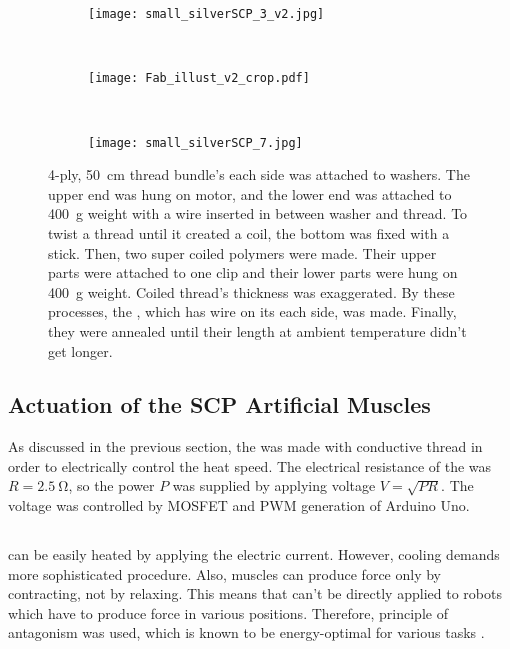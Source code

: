 \begin{figure}
	\centering
	\begin{subfigure}{.15\linewidth}
		\centering\texttt{[image: small\_silverSCP\_3\_v2.jpg]}
		\caption{\label{silverSCP_2}}
	\end{subfigure}
	~
	\begin{subfigure}{.45\linewidth}
		\centering\texttt{[image: Fab\_illust\_v2\_crop.pdf]}
		\caption{\label{silverSCP_illust}}
	\end{subfigure}
	~
	\begin{subfigure}{.15\linewidth}
		\centering\texttt{[image: small\_silverSCP\_7.jpg]}
		\caption{\label{silverSCP_annealing}}
	\end{subfigure}
	\caption[Process of making \scps with silver-painted nylon thread]{ 4-ply, \SI{50}{\centi\meter} thread bundle's each side was attached to washers. The upper end was hung on motor, and the lower end was attached to \SI{400}{\gram} weight with a wire inserted in between washer and thread.  To twist a thread until it created a coil, the bottom was fixed with a stick. Then, two super coiled polymers were made. Their upper parts were attached to one clip and their lower parts were hung on \SI{400}{\gram} weight. Coiled thread's thickness was exaggerated.  By these processes, the \scpnospace, which has wire on its each side, was made. Finally, they were annealed until their length at ambient temperature didn't get longer.}
	\label{silverSCP_makingof}
\end{figure}

\subsection{Actuation of the SCP Artificial Muscles} \label{subsection_actuation}
As discussed in the previous section, the \scp was made with conductive thread in order to electrically control the heat speed. The electrical resistance of the \scp was $R=\SI{2.5}{\ohm}$, so the power $P$ was supplied by applying voltage $V=\sqrt{PR}$. The voltage was controlled by MOSFET and PWM generation of Arduino Uno.

\subsection{\ANTA} \label{subsection_anta}
\scps can be easily heated by applying the electric current. However, cooling demands more sophisticated procedure. Also, muscles can produce force only by contracting, not by relaxing. This means that \scps can't be directly applied to robots which have to produce force in various positions.
Therefore, principle of antagonism was used, which is known to be energy-optimal for various tasks \cite{antagonism}.

